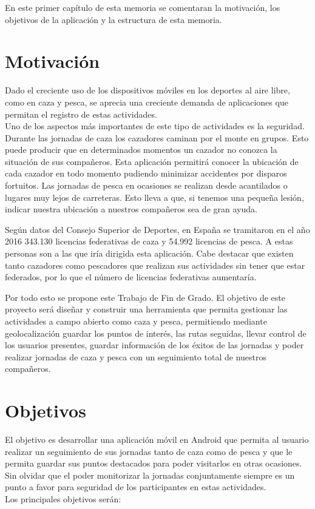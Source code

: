 En este primer capítulo de esta memoria se comentaran la motivación, los objetivos de la aplicación y la estructura de esta memoria. 
\section{Motivación}
Dado el creciente uso de los dispositivos móviles en los deportes al aire libre, como en caza y pesca, se aprecia una creciente demanda de aplicaciones que permitan el registro de estas actividades.\\

Uno de los aspectos más importantes de este tipo de actividades es la seguridad. Durante las jornadas de caza los cazadores caminan por el monte en grupos. Esto puede producir que en determinados momentos un cazador no conozca la situación de sus compañeros.
Esta aplicación permitirá conocer la ubicación de cada cazador en todo momento pudiendo minimizar accidentes por disparos fortuitos. Las jornadas de pesca en ocasiones  se realizan desde acantilados o lugares muy lejos de carreteras. Esto lleva a que, si tenemos una pequeña lesión, indicar nuestra ubicación a nuestros compañeros sea de gran ayuda.

Según datos del Consejo Superior de Deportes, en España  se tramitaron en el año 2016 343.130 licencias federativas de caza y 54.992 licencias de pesca. A estas personas son a las que iría dirigida esta aplicación. Cabe destacar que existen tanto cazadores como pescadores que realizan sus actividades sin tener que estar federados, por lo que el número de licencias federativas aumentaría. 





Por todo esto se propone este Trabajo de Fin de Grado.
El objetivo de este proyecto será diseñar y construir una herramienta que permita gestionar las actividades a campo abierto como
caza y pesca, permitiendo mediante geolocalización guardar los puntos de interés, las rutas seguidas,
llevar control de los usuarios presentes, guardar información de los éxitos de las jornadas y poder realizar jornadas de caza y pesca con un seguimiento  total de nuestros compañeros.


\section{Objetivos}
El objetivo es desarrollar una aplicación móvil en Android que permita al usuario realizar un seguimiento de sus jornadas tanto de caza como de pesca  y que le permita guardar sus puntos destacados para poder visitarlos en otras ocasiones. Sin olvidar que el poder monitorizar la jornadas conjuntamente siempre es un punto a favor para seguridad de los participantes en estas actividades.\\ 
Los principales objetivos serán:

